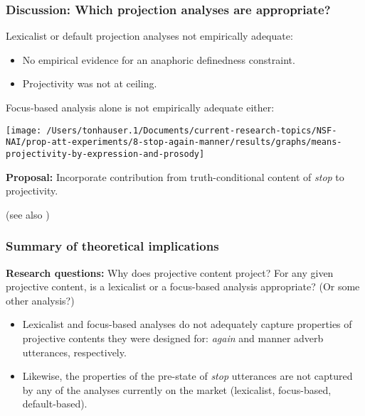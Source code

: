 \documentclass[pdf,xcolor=table,envcountsect,handout]{beamer}
\begin{document}
\begin{frame}
\frametitle{Discussion: Which projection analyses are appropriate?}

Lexicalist or default projection analyses not empirically adequate:

\begin{itemize}[topsep=-2ex,itemsep=-2pt]

\item No empirical evidence for an anaphoric definedness constraint.

\item Projectivity was not at ceiling. 
\end{itemize}

\bigskip
\pause

Focus-based analysis alone is not empirically adequate either:

\hspace*{.5cm} \texttt{[image: /Users/tonhauser.1/Documents/current-research-topics/NSF-NAI/prop-att-experiments/8-stop-again-manner/results/graphs/means-projectivity-by-expression-and-prosody]}

\pause

{\bf Proposal:} Incorporate contribution from truth-conditional content of {\em stop} to projectivity. \begin{tiny} (see also \citealt{tbd-variability}) \end{tiny}

\end{frame}

\begin{frame}
\frametitle{Summary of theoretical implications}

{\bf Research questions:} Why does projective content project? For any given projective content, is a lexicalist or a focus-based analysis appropriate? (Or some other analysis?)

\pause

\begin{itemize}

\item Lexicalist and focus-based analyses do not adequately capture properties of projective contents they were designed for: {\em again} and manner adverb utterances, respectively.

\medskip
\pause

\item Likewise, the properties of the pre-state of {\em stop} utterances are not captured by any of the analyses currently on the market (lexicalist, focus-based, default-based).

\end{itemize}

\hspace*{1cm} 

\end{frame}
\end{document}
